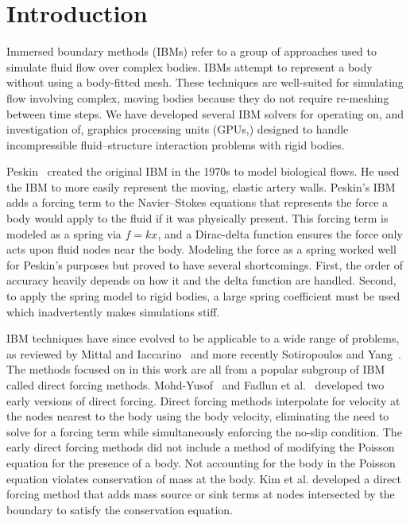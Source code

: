 \mainmatter

\chapter{Introduction}
Immersed boundary methods (IBMs) refer to a group of approaches used to simulate fluid flow over complex bodies. 
IBMs attempt to represent a body without using a body-fitted mesh. 
These techniques are well-suited for simulating flow involving complex, moving bodies because they do not require re-meshing between time steps. 
We have developed several IBM solvers for operating on, and investigation of, graphics processing units (GPUs,) designed to handle incompressible fluid--structure interaction problems with rigid bodies. 

Peskin~\cite{Peskin:1972gh} created the original IBM in the 1970s to model biological flows. 
He used the IBM to more easily represent the moving, elastic artery walls. 
Peskin's IBM adds a forcing term to the Navier--Stokes equations that represents the force a body would apply to the fluid if it was physically present. 
This forcing term is modeled as a spring via $f=kx$, and a Dirac-delta function ensures the force only acts upon fluid nodes near the body. 
Modeling the force as a spring worked well for Peskin's purposes but proved to have several shortcomings. 
First, the order of accuracy heavily depends on how it and the delta function are handled. 
Second, to apply the spring model to rigid bodies, a large spring coefficient must be used which inadvertently makes simulations stiff. 

IBM techniques have since evolved to be applicable to a wide range of problems, as reviewed by Mittal and Iaccarino~\cite{Mittal:2005ii} and more recently Sotiropoulos and Yang~\cite{Sotiropoulos:2014gv}. 
The methods focused on in this work are all from a popular subgroup of IBM called direct forcing methods. 
Mohd-Yusof~\cite{MohdYusof:1997wh} and Fadlun et al.~\cite{Fadlun:2000fl} developed two early versions of direct forcing. 
Direct forcing methods interpolate for velocity at the nodes nearest to the body using the body velocity, eliminating the need to solve for a forcing term while simultaneously enforcing the no-slip condition.
The early direct forcing methods did not include a method of modifying the Poisson equation for the presence of a body. 
Not accounting for the body in the Poisson equation violates conservation of mass at the body. 
Kim et al\cite{kim2001immersed}. developed a direct forcing method that adds mass source or sink terms at nodes intersected by the boundary to satisfy the conservation equation. 

